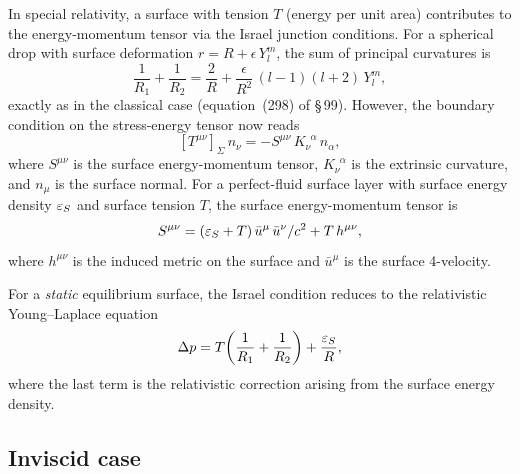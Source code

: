 In special relativity, a surface with tension $T$ (energy per unit area)
contributes to the energy-momentum tensor via the Israel junction
conditions.  For a spherical drop with surface deformation
$r = R + \epsilon\,Y_{l}^{m}$, the sum of principal curvatures is
\begin{equation}\label{eq:rel-10-298R}
  \frac{1}{R_{1}} + \frac{1}{R_{2}}
  = \frac{2}{R}
    + \frac{\epsilon}{R^{2}}\,(l-1)(l+2)\,Y_{l}^{m},
\end{equation}
exactly as in the classical case (equation~(298) of \S\,99).
However, the boundary condition on the stress-energy tensor now reads
\begin{equation}\label{eq:rel-10-302R}
  \left[T^{\mu\nu}\right]_{\Sigma}\,n_{\nu}
  = -S^{\mu\nu}\,K_{\nu}^{\phantom{\nu}\alpha}\,n_{\alpha},
\end{equation}
where $S^{\mu\nu}$ is the surface energy-momentum tensor,
$K_{\nu}^{\phantom{\nu}\alpha}$ is the extrinsic curvature, and
$n_{\mu}$ is the surface normal.  For a perfect-fluid surface layer
with surface energy density $\varepsilon_{S}$ and surface tension $T$,
the surface energy-momentum tensor is
\begin{equation}\label{eq:rel-10-Smunu}
  S^{\mu\nu}
  = (\varepsilon_{S} + T)\,\bar{u}^{\mu}\,\bar{u}^{\nu}/c^{2}
    + T\,h^{\mu\nu},
\end{equation}
where $h^{\mu\nu}$ is the induced metric on the surface and
$\bar{u}^{\mu}$ is the surface 4-velocity.

For a \emph{static} equilibrium surface, the Israel condition
reduces to the relativistic Young--Laplace equation
\begin{equation}\label{eq:rel-10-YL-rel}
  \Delta p = T\!\left(\frac{1}{R_{1}} + \frac{1}{R_{2}}\right)
  + \frac{\varepsilon_{S}}{R},
\end{equation}
where the last term is the relativistic correction arising from the
surface energy density.

\subsection{Inviscid case}\label{sec:rel-10-99-inviscid}


